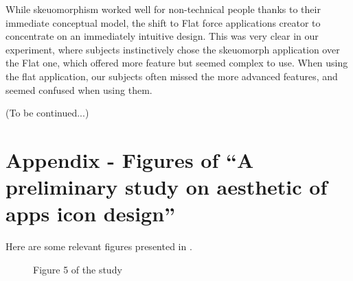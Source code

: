 \documentclass[a4paper,11pt] {article}
\theoremstyle{definition}
\begin{document}
While skeuomorphism worked well for non-technical people thanks to their immediate conceptual model, the shift to Flat force applications creator to concentrate on an immediately intuitive design. This was very clear in our experiment, where subjects instinctively chose the skeuomorph application over the Flat one, which offered more feature but seemed complex to use. When using the flat application, our subjects often missed the more advanced features, and seemed confused when using them.

(To be continued...)

\newpage
\appendix

\section{Appendix - Figures of ``A preliminary study on aesthetic of apps icon design''}
Here are some relevant figures presented in \cite{jpAnalitics}.
  \begin{figure}[H]
    \caption{Figure 5 of the study}\label{jpfig5}
  \end{figure}
\end{document}
